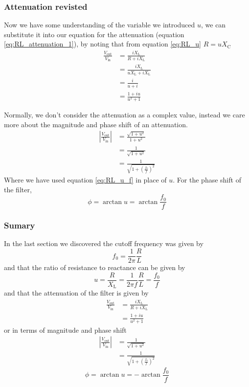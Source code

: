 \subsubsection{Attenuation revisted}
Now we have some understanding of the variable we introduced $u$, we can substitute it into our equation for the attenuation (equation \ref{eq:RL_attenuation_1}), by noting that from equation \ref{eq:RL_u} $R=u X_{\text{C}}$
\begin{align}
  \frac{V_{\text{out}}}{V_{\text{in}}} & = \frac{i X_{\text{L}}}{R+iX_{\text{L}}}\nonumber \\
   & = \frac{i X_{\text{L}}}{u X_{\text{L}}+iX_{\text{L}}} \nonumber \\
   & = \frac{i }{u +i} \nonumber \\
   & = \frac{1+iu}{u^2 + 1} \label{eq:RL_attenuation_2}
\end{align}

Normally, we don't consider the attenuation as a complex value, instead we care more
about the magnitude and phase shift of an attenuation.
\begin{align}
  \left|\frac{V_{\text{out}}}{V_{\text{in}}} \right| & = \frac{\sqrt{1+u^2}}{1+u^2}\nonumber \\
  & = \frac{1}{\sqrt{1+u^2}} \nonumber \\
  & = \frac{1}{\sqrt{1+\left(\frac{f_0}{f}\right)^2}}\label{eq:RL_attenuation_mag}
\end{align}
Where we have used equation \ref{eq:RL_u_f} in place of $u$. For the phase shift of the filter,
\begin{equation}
  \phi = \arctan{u} = \arctan{\frac{f_0}{f}}
\end{equation}

\begin{framed}
\subsubsection*{Sumary}
In the last section we discovered the cutoff frequency was given by
\begin{equation*}
 f_0 = \frac{1}{2\pi}\frac{R}{L}
\end{equation*}
and that the ratio of resistance to reactance can be given by
\begin{equation*}
  u = \frac{R}{X_{\text{L}}} = \frac{1}{2\pi f} \frac{R}{L} = \frac{f_0}{f}
\end{equation*}
and that the attenuation of the filter is given by
\begin{align*}
  \frac{V_{\text{out}}}{V_{\text{in}}} & = \frac{i X_{\text{L}}}{R+iX_{\text{L}}}\\
   & = \frac{1+i u}{u^2 + 1}
\end{align*}
or in terms of magnitude and phase shift
\begin{align*}
  \left|\frac{V_{\text{out}}}{V_{\text{in}}} \right| & = \frac{1}{\sqrt{1+u^2}} \\
  & = \frac{1}{\sqrt{1+\left(\frac{f_0}{f}\right)^2}}
\end{align*}
\begin{equation*}
  \phi = \arctan{u} =  -\arctan{\frac{f_0}{f}}
\end{equation*}
\end{framed}

